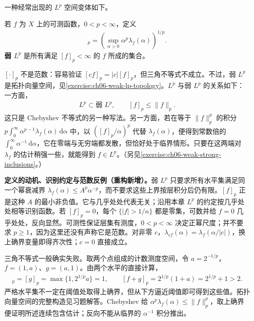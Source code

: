 \documentclass[../../main.tex]{subfiles}
\begin{document}
一种经常出现的 $L^p$ 空间变体如下。
\begin{definition}[弱 $L^p$]\label{definition:ch06-weak-lp}
若 $f$ 为 $X$ 上的可测函数，$0<p<\infty$，定义
\begin{align*}
[f]_p=\left(\sup_{\alpha>0}\alpha^p\lambda_f(\alpha)\right)^{1/p}.
\end{align*}
\textbf{弱 $L^p$} 是所有满足 $[f]_p<\infty$ 的 $f$ 所成的集合。
\end{definition}
$[\cdot]_p$ 不是范数：容易验证 $[cf]_p=|c|[f]_p$，但三角不等式不成立。不过，弱 $L^p$ 是拓扑向量空间，见\cref{exercise:ch06-weak-lp-topology}。$L^p$ 与弱 $L^p$ 的关系如下：一方面，
\begin{align*}
L^p\subset\text{弱 }L^p,\qquad [f]_p\leqslant\|f\|_p.
\end{align*}
这只是 Chebyshev 不等式的另一种写法。另一方面，若在等于 $\|f\|_p^p$ 的积分 $p\int_0^\infty\alpha^{p-1}\lambda_f(\alpha)\,\mathrm d\alpha$ 中，以 $([f]_p/\alpha)^p$ 代替 $\lambda_f(\alpha)$，便得到常数倍的 $\int_0^\infty\alpha^{-1}\,\mathrm d\alpha$，它在零端与无穷端都发散，但恰好处于临界情形。只要在这两端对 $\lambda_f$ 的估计稍强一些，就能得到 $f\in L^p$。（另见\cref{exercise:ch06-weak-strong-inclusions}。）
\begin{remark}
\textbf{定义的动机、识别约定与范数反例（重构新增）。}弱 $L^p$ 只要求所有水平集满足同一个幂衰减界 $\lambda_f(\alpha)\leqslant A^p\alpha^{-p}$，而不要求这些上界按层积分后仍有限。$[f]_p$ 正是这种 $A$ 的最小非负值。它与几乎处处代表无关；沿用本章 $L^p$ 的约定按几乎处处相等识别函数。若 $[f]_p=0$，每个 $\{|f|>1/n\}$ 都是零集，可数并给 $f=0$ 几乎处处，反向显然。可测性保证层集有测度，$0<p<\infty$ 决定正幂尺度；并不要求 $p\geqslant1$，因为这里还没有声称它是范数。对非零 $c$，$\lambda_{cf}(\alpha)=\lambda_f(\alpha/|c|)$，换上确界变量即得齐次性；$c=0$ 直接成立。

三角不等式一般确实失败。取两个点组成的计数测度空间，令 $a=2^{-1/p}$，$f=(1,a)$、$g=(a,1)$。由两个水平的直接计算，
\begin{align*}
[f]_p=[g]_p=\max\{1,2^{1/p}a\}=1,
\qquad [f+g]_p=2^{1/p}(1+a)=2^{1/p}+1>2.
\end{align*}
严格水平集不一定在阈值处取得上确界，但从下方逼近阈值即可得到这些值。拓扑向量空间的完整构造见习题解答。Chebyshev 给 $\alpha^p\lambda_f(\alpha)\leqslant\|f\|_p^p$，取上确界便证明所述连续包含估计；反向不能从临界的 $\alpha^{-1}$ 积分推出。
\end{remark}
\end{document}
